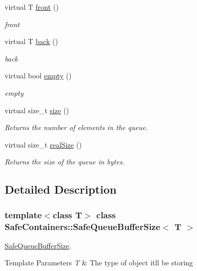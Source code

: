 \begin{DoxyCompactItemize}
virtual T \mbox{\hyperlink{classSafeContainers_1_1SafeQueueBufferSize_afd0c81d73603b43f6ed1a12130733cb6}{front}} ()
\begin{DoxyCompactList}\small\item\em front \end{DoxyCompactList}\item 
virtual T \mbox{\hyperlink{classSafeContainers_1_1SafeQueueBufferSize_a4b4b10ec7856724be38501fbfb6f9394}{back}} ()
\begin{DoxyCompactList}\small\item\em back \end{DoxyCompactList}\item 
virtual bool \mbox{\hyperlink{classSafeContainers_1_1SafeQueueBufferSize_a7f20de3963f43b86282a33108f784831}{empty}} ()
\begin{DoxyCompactList}\small\item\em empty \end{DoxyCompactList}\item 
virtual size\+\_\+t \mbox{\hyperlink{classSafeContainers_1_1SafeQueueBufferSize_a326e5f16d2b178f5065cfef9ebab4d65}{size}} ()
\begin{DoxyCompactList}\small\item\em Returns the number of elements in the queue. \end{DoxyCompactList}\item 
virtual size\+\_\+t \mbox{\hyperlink{classSafeContainers_1_1SafeQueueBufferSize_ae046a90a1ac9683f90c21eeaa4be2f37}{real\+Size}} ()
\begin{DoxyCompactList}\small\item\em Returns the size of the queue in bytes. \end{DoxyCompactList}\end{DoxyCompactItemize}


\subsection{Detailed Description}
\subsubsection*{template$<$class T$>$\newline
class Safe\+Containers\+::\+Safe\+Queue\+Buffer\+Size$<$ T $>$}

\mbox{\hyperlink{classSafeContainers_1_1SafeQueueBufferSize}{Safe\+Queue\+Buffer\+Size}}. 


\begin{DoxyTemplParams}{Template Parameters}
{\em T} & The type of object it\textquotesingle{}ll be storing \\
\hline
\end{DoxyTemplParams}


